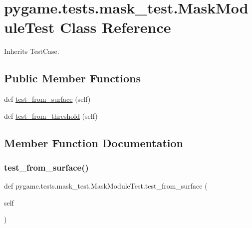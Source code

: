 \hypertarget{classpygame_1_1tests_1_1mask__test_1_1_mask_module_test}{}\section{pygame.\+tests.\+mask\+\_\+test.\+Mask\+Module\+Test Class Reference}
\label{classpygame_1_1tests_1_1mask__test_1_1_mask_module_test}


Inherits Test\+Case.

\subsection*{Public Member Functions}
\begin{DoxyCompactItemize}
\item 
def \hyperlink{classpygame_1_1tests_1_1mask__test_1_1_mask_module_test_a7233fc4d043789ad42d968f74dcc867e}{test\+\_\+from\+\_\+surface} (self)
\item 
def \hyperlink{classpygame_1_1tests_1_1mask__test_1_1_mask_module_test_a6f767869d606e7163af83972d2cd2873}{test\+\_\+from\+\_\+threshold} (self)
\end{DoxyCompactItemize}


\subsection{Member Function Documentation}
\mbox{\label{classpygame_1_1tests_1_1mask__test_1_1_mask_module_test_a7233fc4d043789ad42d968f74dcc867e}} 
\subsubsection{\texorpdfstring{test\+\_\+from\+\_\+surface()}{test\_from\_surface()}}
{\footnotesize\ttfamily def pygame.\+tests.\+mask\+\_\+test.\+Mask\+Module\+Test.\+test\+\_\+from\+\_\+surface (\begin{DoxyParamCaption}\item[{}]{self }\end{DoxyParamCaption})}

